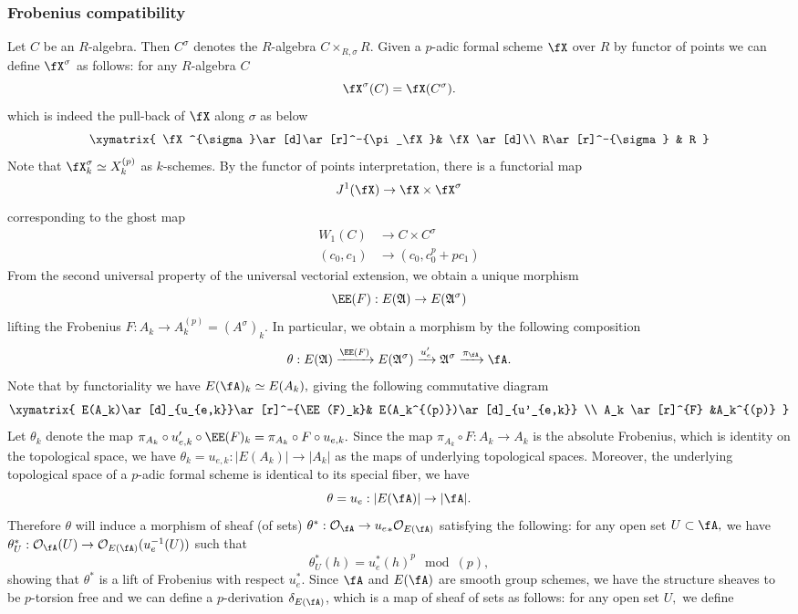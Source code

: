 \documentclass[11pt]{amsart}
\theoremstyle{plain}
\theoremstyle{definition}
\newcommand{\sO}{\mathcal{O}}
\begin{document}
\subsubsection{Frobenius compatibility} Let $C$ be an $R$-algebra. Then $C^{\sigma }$ denotes the $R$-algebra $C\times _{R,\sigma }R$. Given a $p$-adic formal scheme $\fX$ over $R$ by functor of points we can define $\fX^\sigma$ as follows: for any $R$-algebra $C$
\[\fX^\sigma(C)=\fX(C^\sigma).
\]
which is indeed the pull-back of $\fX$ along $\sigma$ as below
\[
\xymatrix{
\fX^{\sigma}\ar[d]\ar[r]^-{\pi_\fX}& \fX\ar[d]\\
R\ar[r]^-{\sigma} & R
}
\] 
Note that $\fX^\sigma_k\simeq X_k^{(p)}$ as $k$-schemes.
By the functor of points interpretation, there is a functorial map
\[
J^1 (\fX)\to \fX\times \fX^{\sigma }
\]
corresponding to the ghost map
\begin{align*}
W_1 (C)&\to C\times C^{\sigma }\\
(c_0, c_1)& \to (c_0, c_0^p+p c_1)
\end{align*}
From the second universal property of the universal vectorial extension,  we obtain a unique morphism 
\[
\EE(F):E(\mathfrak{A})\to E(\mathfrak{A}^{\sigma })
\]
lifting the Frobenius $F:A_k \to A_k ^{(p)}=(A^{\sigma })_k $. In particular, we obtain a morphism by the following composition
\[
\theta: E(\mathfrak{A})\xrightarrow{\EE(F)} E(\mathfrak{A}^{\sigma}) \xrightarrow{u'_e} \mathfrak{A}^{\sigma}\xrightarrow{\pi_{\fA}}\fA.
\]
Note that by functoriality we have $E(\fA)_k\simeq E(A_k),$ giving the following commutative diagram
\[
\xymatrix{
E(A_k)\ar[d]_{u_{e,k}}\ar[r]^-{\EE(F)_k}& E(A_k^{(p)})\ar[d]_{u'_{e,k}} \\
A_k \ar[r]^{F} &A_k^{(p)}
}
\]
Let $\theta_k$ denote the map $\pi_{A_k}\circ u'_{e,k}\circ \EE(F)_k=\pi_{A_k}\circ F\circ u_{e,k}.$ Since the map $\pi_{A_k}\circ F:A_k\to A_k$ is the absolute Frobenius, which is identity on the topological space, we have  $\theta_k=u_{e,k}: |E(A_k)|\to |A_k|$ as the maps of underlying topological spaces. Moreover, the underlying topological space of a $p$-adic formal scheme is identical to its special fiber, we have 
$$\theta=u_e:|E(\fA)|\to |\fA|.$$
Therefore $\theta$ will induce a morphism of sheaf (of sets) $\theta^*:\sO_{\fA}\to {u_e}_*\sO_{E(\fA)}$ satisfying the following: for any open set $U\subset \fA,$ we have $\theta^*_U: \sO_\fA(U) \to \sO_{E(\fA)}(u_e^{-1}(U))$ such that $$\theta^*_U(h)={u_e^*(h)}^p \mod(p),$$ showing that $\theta^*$ is a lift of Frobenius with respect $u_e^*.$  Since $\fA$ and  $E(\fA)$ are smooth group schemes, we have the structure sheaves to be $p$-torsion free and we can define a $p$-derivation $\delta_{E(\fA)}$, which is a map of sheaf of sets as follows: for any open set $U,$ we define
\end{document}
